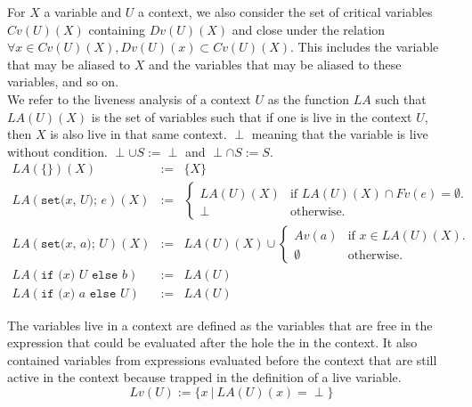\documentclass[12pt,a4paper]{article}
\newcommand{\cl}[1]{\texttt{#1}}
\newcommand{\ucont}[1]{\{#1\}}
\begin{document}
For $X$ a variable and $U$ a context, we also consider the set of critical variables $Cv(U)(X)$ containing $Dv(U)(X)$ and close under the relation $\forall x \in Cv(U)(X), Dv(U)(x) \subset Cv(U)(X)$. This includes the variable that may be aliased to $X$ and the variables that may be aliased to these variables, and so on.\\

We refer to the liveness analysis of a context $U$ as the function $LA$ such that $LA(U)(X)$ is the set of variables such that if one is live in the context $U$, then $X$ is also live in that same context. $\perp$ meaning that the variable is live without condition. $\perp \cup S := \perp$ and $\perp \cap S := S$.
\begin{eqnarray*}
LA(\ucont{} )(X) &:=& \{ X \} \\
LA( \cl{set(} x \cl{, } U \cl{); } e )(X) &:=& 
\left\lbrace \begin{array}{ll}
LA(U)(X) & \text{if $LA(U)(X) \cap Fv(e) = \emptyset$.} \\
\perp & \text{otherwise.}
\end{array} \right. \\
LA( \cl{set(} x \cl{, } a \cl{); } U )(X) &:=& LA(U)(X) \cup \left\lbrace \begin{array}{ll}
Av(a) & \text{if $x \in LA(U)(X)$.} \\
\emptyset & \text{otherwise.}
\end{array} \right. \\
LA( \cl{if (} x \cl{) } U \cl{ else } b ) &:=& LA(U) \\
LA( \cl{if (} x \cl{) } a \cl{ else } U ) &:=& LA(U)
\end{eqnarray*}

The variables live in a context are defined as the variables that are free in the expression that could be evaluated after the hole the in the context. It also contained variables from expressions evaluated before the context that are still active in the context because trapped in the definition of a live variable.
$$ Lv(U) := \{ x \ | \ LA(U)(x) = \perp \} $$

\end{document}
